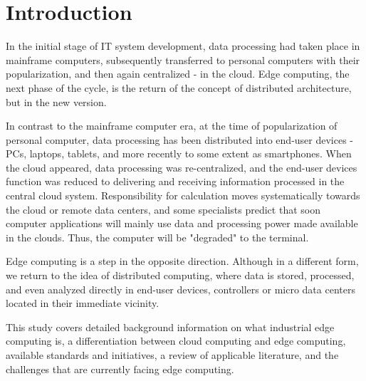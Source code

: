 \section{Introduction}\label{sec:introduction}
In the initial stage of IT system development, data processing had taken place in mainframe computers, subsequently transferred to personal computers with their popularization, and then again centralized - in the cloud. Edge computing, the next phase of the cycle, is the return of the concept of distributed architecture, but in the new version.\par
In contrast to the mainframe computer era, at the time of popularization of personal computer, data processing has been distributed into end-user devices - PCs, laptops, tablets, and more recently to some extent as smartphones. When the cloud appeared, data processing was re-centralized, and the end-user devices function was reduced to delivering and receiving information processed in the central cloud system. Responsibility for calculation moves systematically towards the cloud or remote data centers, and some specialists predict that soon computer applications will mainly use data and processing power made available in the clouds. Thus, the computer will be "degraded" to the terminal.\par
Edge computing is a step in the opposite direction. Although in a different form, we return to the idea of distributed computing, where data is stored, processed, and even analyzed directly in end-user devices, controllers or micro data centers located in their immediate vicinity.\par
This study covers detailed background information on what industrial edge computing is, a differentiation between cloud computing and edge computing, available standards and initiatives, a review of applicable literature, and the challenges that are currently facing edge computing.\par
\vspace{5 mm}
 
 
